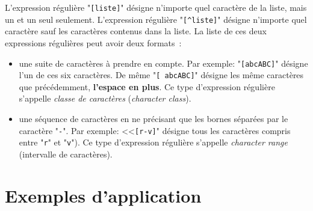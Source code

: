 L'expression r{\'e}guli{\`e}re "\verb=[liste]=" d{\'e}signe n'importe quel
caract{\`e}re de la liste, mais un et un seul seulement. L'expression
r{\'e}guli{\`e}re "\verb=[^liste]=" d{\'e}signe n'importe quel caract{\`e}re sauf les
caract{\`e}res contenus dans la liste. La liste de ces deux expressions
r{\'e}guli{\`e}res peut avoir deux formats~:
\begin{itemize}
	\item	une suite de caract{\`e}res {\`a} prendre en compte. Par exemple:
			"\verb=[abcABC]=" d{\'e}signe l'un de ces six caract{\`e}res. De m{\^e}me
			"\verb*=[ abcABC]=" d{\'e}signe les m{\^e}me caract{\`e}res que pr{\'e}c{\'e}demment,
			\textbf{l'espace en plus}. Ce type d'expression r{\'e}guli{\`e}re s'appelle
			 \textsl{classe de caract{\`e}res} (\textsl{character class}).
	\item	une s{\'e}quence de caract{\`e}res en ne pr{\'e}cisant que les bornes s{\'e}par{\'e}es par
			le caract{\`e}re "\texttt{-}". Par exemple: <<\verb=[r-v]=" d{\'e}signe
			tous les caract{\`e}res compris entre "\texttt{r}" et "\texttt{v}").
			Ce type d'expression r{\'e}guli{\`e}re s'appelle \textsl{character range}
			(intervalle de caract{\`e}res).
\end{itemize}

\section{Exemples d'application}

